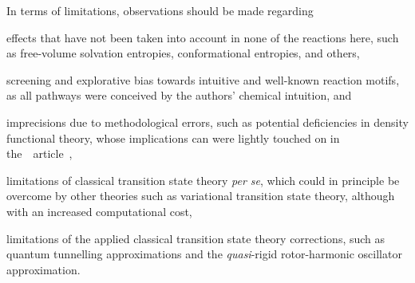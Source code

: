 
In terms of limitations, observations should be made regarding
\begin{itemize*}
	\item effects that have not been taken into account in none of the reactions here,
	      such as free-volume solvation entropies, conformational entropies, and others,
	\item screening and explorative bias towards intuitive and well-known reaction motifs,
	      as all pathways were conceived by the authors' chemical intuition, and
	\item imprecisions due to methodological errors, such as potential deficiencies in density functional theory,
	      whose implications can were lightly touched on in the~\overreact{}~article~\cite{Schneider_2022},
	\item limitations of classical transition state theory \emph{per se},
	      which could in principle be overcome by other theories such as variational transition state theory,
	      although with an increased computational cost,
	\item limitations of the applied classical transition state theory corrections,
	      such as quantum tunnelling approximations
	      and the \emph{quasi}-rigid rotor-harmonic oscillator approximation.
\end{itemize*}


